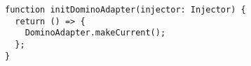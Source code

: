 \begin{verbatim}
function initDominoAdapter(injector: Injector) {
  return () => {
    DominoAdapter.makeCurrent();
  };
}
\end{verbatim}
